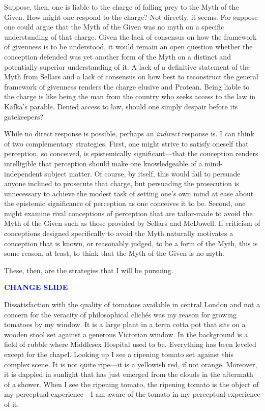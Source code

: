 \documentclass[12pt]{article}
\newcommand{\change}{\textcolor{blue}{\textbf{CHANGE SLIDE}}}
\begin{document}
Suppose, then, one is liable to the charge of falling prey to the Myth of the Given. How might one respond to the charge? Not directly, it seems. For suppose one could argue that the Myth of the Given was no myth on a specific understanding of that charge. Given the lack of consensus on how the framework of givenness is to be understood, it would remain an open question whether the conception defended was yet another form of the Myth on a distinct and potentially superior understanding of it. A lack of a definitive statement of the Myth from Sellars and a lack of consensus on how best to reconstruct the general framework of givenness renders the charge elusive and Protean. Being liable to the charge is like being the man from the country who seeks access to the law in Kafka's parable. Denied access to law, should one simply despair before its gatekeepers?

While no direct response is possible, perhaps an \emph{indirect} response is. I can think of two complementary strategies. First, one might strive to satisfy oneself that perception, so conceived, is epistemically significant---that the conception renders intelligible that perception should make one knowledgeable of a mind-independent subject matter. Of course, by itself, this would fail to persuade anyone inclined to prosecute that charge, but persuading the prosecution is unnecessary to achieve the modest task of setting one's own mind at ease about the epistemic significance of perception as one conceives it to be. Second, one might examine rival conceptions of perception that are tailor-made to avoid the Myth of the Given such as those provided by Sellars and McDowell. If criticism of conceptions designed specifically to avoid the Myth naturally motivates a conception that is known, or reasonably judged, to be a form of the Myth, this is some reason, at least, to think that the Myth of the Given is no myth.

These, then, are the strategies that I will be pursuing.

\change

Dissatisfaction with the quality of tomatoes available in central London and not a concern for the veracity of philosophical clichés was my reason for growing tomatoes by my window. It is a large plant in a terra cotta pot that sits on a wooden stool set against a generous Victorian window. In the background is a field of rubble where Middlesex Hospital used to be. Everything has been leveled except for the chapel. Looking up I see a ripening tomato set against this complex scene. It is not quite ripe---it is a yellowish red, if not orange. Moreover, it is dappled in sunlight that has just emerged from the clouds in the aftermath of a shower. When I see the ripening tomato, the ripening tomato is the object of my perceptual experience---I am aware of the tomato in my perceptual experience of it. 
\end{document}
